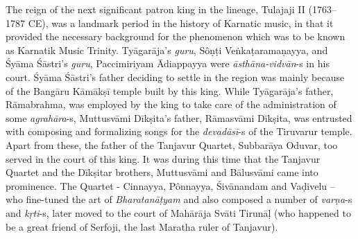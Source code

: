 The reign of the next significant patron king in the lineage, Tulajaji II (1763–1787 CE), was a landmark period in the history of Karnatic music, in that it provided the necessary background for the phenomenon which was to be known as Karnatik Music Trinity. Tyāgarāja’s \textit{guru}, Sôṇṭi Veṅkaṭaramaṇayya, and Śyāma Śāstri’s \textit{guru}, Paccimiriyam Ādiappayya were \textit{āsthāna-vidvān}-s in his court. Śyāma Śāstri’s father deciding to settle in the region was mainly because of the Bangāru Kāmākṣī temple built by this king. While Tyāgarāja’s father, Rāmabrahma, was employed by the king to take care of the administration of some \textit{agrahāra}-s, Muttusvāmi Dīkṣita’s father, Rāmasvāmi Dīkṣita, was entrusted with composing and formalizing songs for the \textit{devadāsī}-s of the Tiruvarur temple. Apart from these, the father of the Tanjavur Quartet, Subbarāya Oduvar, too served in the court of this king. It was during this time that the Tanjavur Quartet and the Dīkṣitar brothers, Muttusvāmi and Bālusvāmi came into prominence. The Quartet - Cinnayya, Pônnayya, Śivānandam and Vaḍivelu – who fine-tuned the art of \textit{Bharatanāṭyam} and also composed a number of \textit{varṇa}-s and \textit{kṛti}-s, later moved to the court of Mahārāja Svāti Tirunāḷ (who happened to be a great friend of Serfoji, the last Maratha ruler of Tanjavur).


